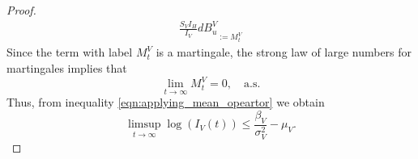 \documentclass{amsart}
\theoremstyle{plain}
\theoremstyle{definition}
\begin{document}
\begin{proof}
\begin{equation}
\begin{aligned}
{                            \frac{S_V I_H}{I_V}
                            dB_u^V
                    }_{:=M_t^V}                  
                \end{aligned}
            \end{equation}
%
        Since the term with label $M_t^V$ is a martingale, 
        the strong law of large numbers for martingales \cite{Mao} implies that
        $$
            \lim_{t \to \infty} M_t^V = 0, \quad \text{a.s.}
        $$
        Thus, from inequality \eqref{eqn:applying_mean_opeartor} we obtain
        \begin{equation}\label{eqn:bound_vector_noise}
            \limsup_{t \to \infty} \log(I_V(t)) 
                \leq
                \frac{\beta_V}{\sigma_V^2} - \mu_V.           
        \end{equation}
        \end{proof}
%
%
%
%
\end{document}
